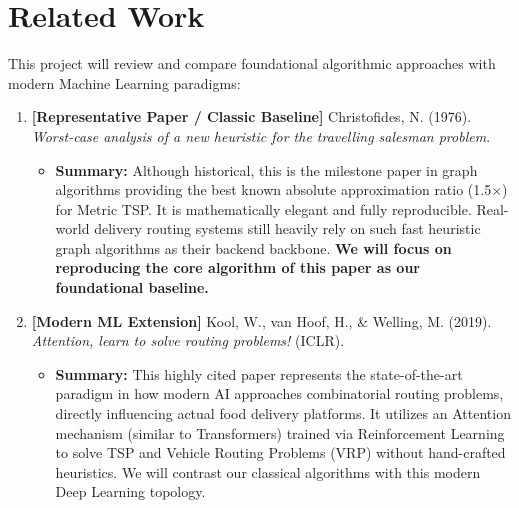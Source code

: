 \documentclass[10pt]{article}
\begin{document}
\section{Related Work}
This project will review and compare foundational algorithmic approaches with modern Machine Learning paradigms:
\begin{enumerate}
    \item \textbf{[Representative Paper / Classic Baseline]} Christofides, N. (1976). \textit{Worst-case analysis of a new heuristic for the travelling salesman problem}. 
    \begin{itemize}
        \item \textbf{Summary:} Although historical, this is the milestone paper in graph algorithms providing the best known absolute approximation ratio (1.5$\times$) for Metric TSP. It is mathematically elegant and fully reproducible. Real-world delivery routing systems still heavily rely on such fast heuristic graph algorithms as their backend backbone. \textbf{We will focus on reproducing the core algorithm of this paper as our foundational baseline.}
    \end{itemize}
    \item \textbf{[Modern ML Extension]} Kool, W., van Hoof, H., \& Welling, M. (2019). \textit{Attention, learn to solve routing problems!} (ICLR).
    \begin{itemize}
        \item \textbf{Summary:} This highly cited paper represents the state-of-the-art paradigm in how modern AI approaches combinatorial routing problems, directly influencing actual food delivery platforms. It utilizes an Attention mechanism (similar to Transformers) trained via Reinforcement Learning to solve TSP and Vehicle Routing Problems (VRP) without hand-crafted heuristics. We will contrast our classical algorithms with this modern Deep Learning topology.
    \end{itemize}
\end{enumerate}
\end{document}
